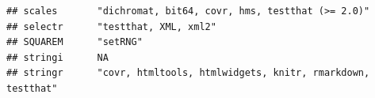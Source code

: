 \documentclass[]{article}
\begin{document}
\begin{verbatim}
## scales       "dichromat, bit64, covr, hms, testthat (>= 2.0)"                                                                                                                                                                                                                                                                                                                                                                                                                                                                                                                                          
## selectr      "testthat, XML, xml2"                                                                                                                                                                                                                                                                                                                                                                                                                                                                                                                                                                     
## SQUAREM      "setRNG"                                                                                                                                                                                                                                                                                                                                                                                                                                                                                                                                                                                  
## stringi      NA                                                                                                                                                                                                                                                                                                                                                                                                                                                                                                                                                                                        
## stringr      "covr, htmltools, htmlwidgets, knitr, rmarkdown, testthat"                                                                                                                                                                                                                                                                                                                                                                                                                                                                                                                                

\end{verbatim}
\end{document}
